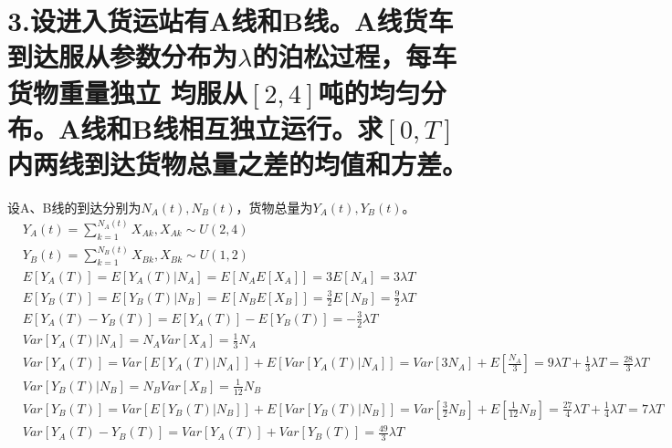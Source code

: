 \documentclass[UTF8]{ctexart}
\begin{document}
\section*{3.设进入货运站有A线和B线。A线货车到达服从参数分布为$\lambda$的泊松过程，每车货物重量独立
  均服从$[2,4]$吨的均匀分布。A线和B线相互独立运行。求$[0,T]$内两线到达货物总量之差的均值和方差。}
设A、B线的到达分别为$N_A(t),N_B(t)$，货物总量为$Y_A(t),Y_B(t)$。
\begin{equation*}
  \begin{aligned}
     & Y_A(t)=\sum\limits_{k=1}^{N_A(t)}X_{Ak},X_{Ak}\sim U(2,4)                                \\
     & Y_B(t)=\sum\limits_{k=1}^{N_B(t)}X_{Bk},X_{Bk}\sim U(1,2)                                \\
     & E[Y_A(T)]=E[Y_A(T)\lvert N_A]=E[N_AE[X_A]]=3E[N_A]=3\lambda T                            \\
     & E[Y_B(T)]=E[Y_B(T)\lvert N_B]=E[N_BE[X_B]]=\frac{3}{2}E[N_B]=\frac{9}{2}\lambda T        \\
     & E[Y_A(T)-Y_B(T)]=E[Y_A(T)]-E[Y_B(T)]=-\frac{3}{2}\lambda T                               \\
     & Var[Y_A(T)\lvert N_A]=N_AVar[X_A]=\frac{1}{3}N_A                                         \\
     & Var[Y_A(T)]=Var[E[Y_A(T)\lvert N_A]]+E[Var[Y_A(T)\lvert N_A]]=Var[3N_A]+E[\frac{N_A}{3}]
    =9\lambda T+\frac{1}{3}\lambda T=\frac{28}{3}\lambda T                                      \\
     & Var[Y_B(T)\lvert N_B]=N_BVar[X_B]=\frac{1}{12}N_B                                        \\
     & Var[Y_B(T)]=Var[E[Y_B(T)\lvert N_B]]+E[Var[Y_B(T)\lvert N_B]]=Var[\frac{3}{2}N_B]
    +E[\frac{1}{12}N_B]=\frac{27}{4}\lambda T+\frac{1}{4}\lambda T=7\lambda T                   \\
     & Var[Y_A(T)-Y_B(T)]=Var[Y_A(T)]+Var[Y_B(T)]=\frac{49}{3}\lambda T                         \\
  \end{aligned}
\end{equation*}
\end{document}
